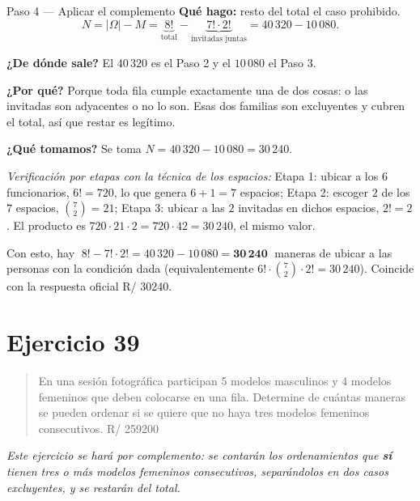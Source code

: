 \documentclass[11pt]{article}
\begin{document}
\begin{paso}{Paso 4 --- Aplicar el complemento}
\textbf{Qué hago:} resto del total el caso prohibido.
\[
  N = |\Omega| - M = \underbrace{8!}_{\text{total}} - \underbrace{7!\cdot 2!}_{\text{invitadas juntas}} = 40\,320 - 10\,080 .
\]

\textbf{¿De dónde sale?} El $40\,320$ es el Paso 2 y el $10\,080$ el Paso 3.

\textbf{¿Por qué?} Porque toda fila cumple exactamente una de dos cosas: o las invitadas son adyacentes o no lo son. Esas dos familias son excluyentes y cubren el total, así que restar es legítimo.

\textbf{¿Qué tomamos?} Se toma $N = 40\,320-10\,080 = 30\,240$.

\emph{Verificación por etapas con la técnica de los espacios:} Etapa 1: ubicar a los $6$ funcionarios, $6!=720$, lo que genera $6+1=7$ espacios; Etapa 2: escoger $2$ de los $7$ espacios, $\binom{7}{2}=21$; Etapa 3: ubicar a las $2$ invitadas en dichos espacios, $2!=2$. El producto es $720\cdot 21\cdot 2 = 720\cdot 42 = 30\,240$, el mismo valor.
\end{paso}

\begin{resp}
Con esto, hay $\;8!-7!\cdot 2!=40\,320-10\,080=\mathbf{30\,240}\;$ maneras de ubicar a las personas con la condición dada (equivalentemente $6!\cdot\binom{7}{2}\cdot 2!=30\,240$). Coincide con la respuesta oficial R/ 30240.
\end{resp}

\section*{Ejercicio 39}

\begin{quote}
En una sesión fotográfica participan 5 modelos masculinos y 4 modelos femeninos que deben colocarse en una fila. Determine de cuántas maneras se pueden ordenar si se quiere que no haya tres modelos femeninos consecutivos. \hfill R/ 259200
\end{quote}

\emph{Este ejercicio se hará por complemento: se contarán los ordenamientos que \textbf{sí} tienen tres o más modelos femeninos consecutivos, separándolos en dos casos excluyentes, y se restarán del total.}
\end{document}
